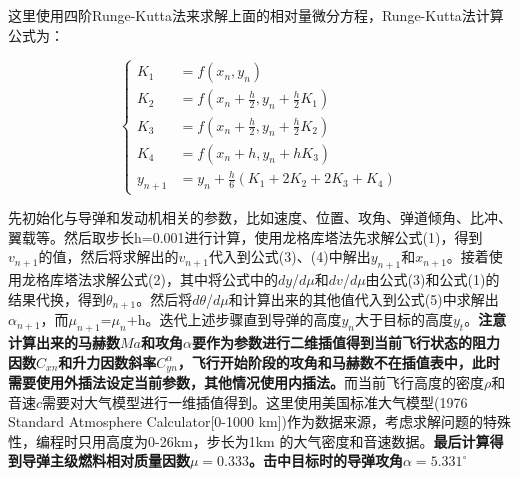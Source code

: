 \documentclass{ctexart}
\begin{document}
这里使用四阶Runge-Kutta法来求解上面的相对量微分方程，Runge-Kutta法计算公式为：

\begin{equation}
\left\{
\begin{aligned}
K_1 &= f(x_n,y_n) \\
K_2 &= f(x_n+\frac{h}{2},y_n+\frac{h}{2}K_1) \\
K_3 &= f(x_n+\frac{h}{2},y_n+\frac{h}{2}K_2) \\
K_4 &= f(x_n+h,y_n+hK_3) \\
y_{n+1} &= y_n + \frac{h}{6}(K_1+2K_2+2K_3+K_4)
\end{aligned}
\right.
\end{equation}


先初始化与导弹和发动机相关的参数，比如速度、位置、攻角、弹道倾角、比冲、翼载等。然后取步长h=0.001进行计算，使用龙格库塔法先求解公式(1)，得到$v_{n+1}$的值，然后将求解出的$v_{n+1}$代入到公式(3)、(4)中解出$y_{n+1}$和$x_{n+1}$。接着使用龙格库塔法求解公式(2)，其中将公式中的$dy$/$d\mu$和$dv$/$d\mu$由公式(3)和公式(1)的结果代换，得到$\theta_{n+1}$。然后将$d\theta$/$d\mu$和计算出来的其他值代入到公式(5)中求解出$\alpha_{n+1}$，而$\mu_{n+1}$=$\mu_n$+h。迭代上述步骤直到导弹的高度$y_n$大于目标的高度$y_t$。\textbf{注意计算出来的马赫数$Ma$和攻角$\alpha$要作为参数进行二维插值得到当前飞行状态的阻力因数$C_{xn}$和升力因数斜率$C^{\alpha}_{yn}$，飞行开始阶段的攻角和马赫数不在插值表中，此时需要使用外插法设定当前参数，其他情况使用内插法。}而当前飞行高度的密度$\rho$和音速$c$需要对大气模型进行一维插值得到。这里使用美国标准大气模型(1976 Standard Atmosphere Calculator[0-1000 km])作为数据来源，考虑求解问题的特殊性，编程时只用高度为0-26km，步长为1km 的大气密度和音速数据。\textbf{最后计算得到导弹主级燃料相对质量因数$\mu=0.333$。击中目标时的导弹攻角$\alpha=5.331^{\circ}$}

\clearpage
\end{document}
